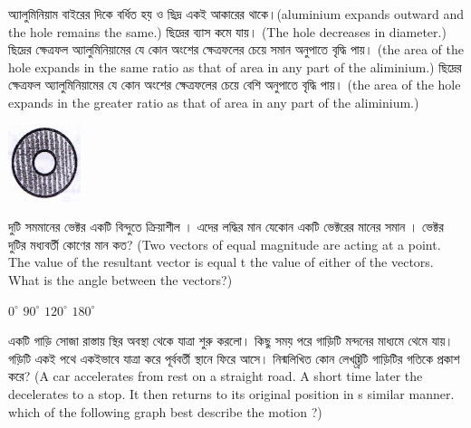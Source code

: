 \documentclass[addpoints]{exam}
\begin{document}
\begin{questions}
\begin{minipage}{0.6\textwidth}\raggedright
\begin{oneparchoices}
\choice অ্যালুমিনিয়াম বাইরের দিকে বর্ধিত হয় ও ছিদ্র একই আকারের থাকে।(aluminium expands outward and the hole remains the same.)
\choice  ছিদ্রের ব্যাস কমে যায়। (The hole decreases in diameter.)
\choice  ছিদ্রের ক্ষেত্রফল অ্যালুমিনিয়ামের যে কোন অংশের ক্ষেত্রফলের চেয়ে সমান অনুপাতে বৃদ্ধি পায়। (the area of the hole expands in the same ratio as that of area in any part of the aliminium.)
\choice ছিদ্রের ক্ষেত্রফল অ্যালুমিনিয়ামের যে কোন অংশের ক্ষেত্রফলের চেয়ে বেশি অনুপাতে বৃদ্ধি পায়। (the area of the hole expands in the greater ratio as that of area in any part of the aliminium.)
\end{oneparchoices}
\end{minipage}
\hfill%
\begin{minipage}{0.3\textwidth}%
\includegraphics{du-al.png}
\end{minipage}%



\question   দুটি সমমানের ভেক্টর একটি বিন্দুতে ক্রিয়াশীল । এদের লদ্ধির মান যেকোন একটি ভেক্টরের মানের সমান । ভেক্টর দুটির মধ্যবর্তী কোণের মান কত? (Two vectors of equal magnitude are acting at a point. The value of the resultant vector is equal t the value of either of the vectors. What is the angle between the vectors?)

\begin{oneparchoices}
\choice $ 0^{\circ} $
\choice $ 90^{\circ} $
\choice $ 120^{\circ} $
\choice $ 180^{\circ} $
\end{oneparchoices}

\question একটি গাড়ি সোজা রাস্তায় স্থির অবস্থা থেকে যাত্রা শুরু করলো। কিছু সময় পরে গাড়িটি মন্দনের মাধ্যমে থেমে যায়। গড়িটি একই পথে একইভাবে যাত্রা করে পূর্ববর্তী স্থানে ফিরে আসে। নিন্মলিখিত কোন লেখচ্ত্রিটি গাড়িটির গতিকে প্রকাশ করে? (A car accelerates from rest on a straight road. A short time later the decelerates to a stop. It then returns to its original position in s similar manner. which of the following graph best describe the motion ?)


\end{questions}
\end{document}
